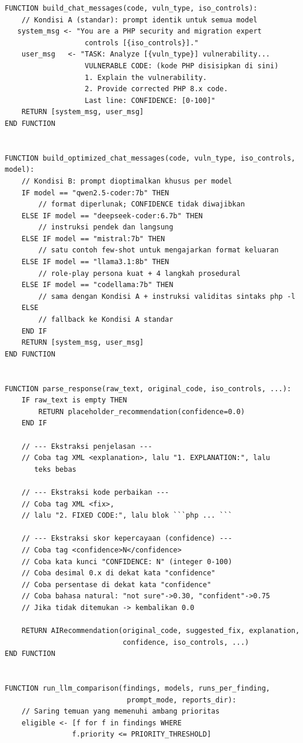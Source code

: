 \begin{lstlisting}[style=pseudocodestyle]
FUNCTION build_chat_messages(code, vuln_type, iso_controls):
    // Kondisi A (standar): prompt identik untuk semua model
   system_msg <- "You are a PHP security and migration expert
                   controls [{iso_controls}]."
    user_msg   <- "TASK: Analyze [{vuln_type}] vulnerability...
                   VULNERABLE CODE: (kode PHP disisipkan di sini)
                   1. Explain the vulnerability.
                   2. Provide corrected PHP 8.x code.
                   Last line: CONFIDENCE: [0-100]"
    RETURN [system_msg, user_msg]
END FUNCTION


FUNCTION build_optimized_chat_messages(code, vuln_type, iso_controls, 
model):
    // Kondisi B: prompt dioptimalkan khusus per model
    IF model == "qwen2.5-coder:7b" THEN
        // format diperlunak; CONFIDENCE tidak diwajibkan
    ELSE IF model == "deepseek-coder:6.7b" THEN
        // instruksi pendek dan langsung
    ELSE IF model == "mistral:7b" THEN
        // satu contoh few-shot untuk mengajarkan format keluaran
    ELSE IF model == "llama3.1:8b" THEN
        // role-play persona kuat + 4 langkah prosedural
    ELSE IF model == "codellama:7b" THEN
        // sama dengan Kondisi A + instruksi validitas sintaks php -l
    ELSE
        // fallback ke Kondisi A standar
    END IF
    RETURN [system_msg, user_msg]
END FUNCTION


FUNCTION parse_response(raw_text, original_code, iso_controls, ...):
    IF raw_text is empty THEN
        RETURN placeholder_recommendation(confidence=0.0)
    END IF

    // --- Ekstraksi penjelasan ---
    // Coba tag XML <explanation>, lalu "1. EXPLANATION:", lalu 
       teks bebas

    // --- Ekstraksi kode perbaikan ---
    // Coba tag XML <fix>, 
    // lalu "2. FIXED CODE:", lalu blok ```php ... ```

    // --- Ekstraksi skor kepercayaan (confidence) ---
    // Coba tag <confidence>N</confidence>
    // Coba kata kunci "CONFIDENCE: N" (integer 0-100)
    // Coba desimal 0.x di dekat kata "confidence"
    // Coba persentase di dekat kata "confidence"
    // Coba bahasa natural: "not sure"->0.30, "confident"->0.75
    // Jika tidak ditemukan -> kembalikan 0.0

    RETURN AIRecommendation(original_code, suggested_fix, explanation,
                            confidence, iso_controls, ...)
END FUNCTION


FUNCTION run_llm_comparison(findings, models, runs_per_finding,
                             prompt_mode, reports_dir):
    // Saring temuan yang memenuhi ambang prioritas
    eligible <- [f for f in findings WHERE 
                f.priority <= PRIORITY_THRESHOLD]


\end{lstlisting}
